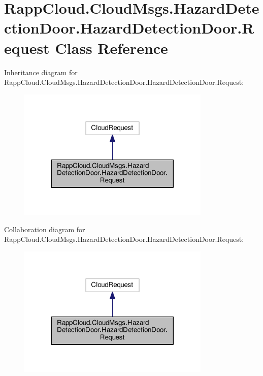 \hypertarget{classRappCloud_1_1CloudMsgs_1_1HazardDetectionDoor_1_1HazardDetectionDoor_1_1Request}{\section{Rapp\-Cloud.\-Cloud\-Msgs.\-Hazard\-Detection\-Door.\-Hazard\-Detection\-Door.\-Request Class Reference}
\label{classRappCloud_1_1CloudMsgs_1_1HazardDetectionDoor_1_1HazardDetectionDoor_1_1Request}
}


Inheritance diagram for Rapp\-Cloud.\-Cloud\-Msgs.\-Hazard\-Detection\-Door.\-Hazard\-Detection\-Door.\-Request\-:
\nopagebreak
\begin{figure}[H]
\begin{center}
\leavevmode
\includegraphics[width=260pt]{classRappCloud_1_1CloudMsgs_1_1HazardDetectionDoor_1_1HazardDetectionDoor_1_1Request__inherit__graph}
\end{center}
\end{figure}


Collaboration diagram for Rapp\-Cloud.\-Cloud\-Msgs.\-Hazard\-Detection\-Door.\-Hazard\-Detection\-Door.\-Request\-:
\nopagebreak
\begin{figure}[H]
\begin{center}
\leavevmode
\includegraphics[width=260pt]{classRappCloud_1_1CloudMsgs_1_1HazardDetectionDoor_1_1HazardDetectionDoor_1_1Request__coll__graph}
\end{center}
\end{figure}
